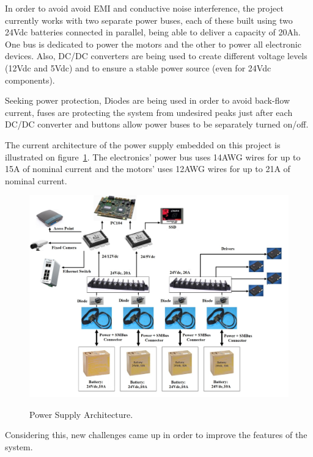 \documentclass{ifacconf}
\begin{document}
In order to avoid avoid EMI and conductive noise interference, the project
currently works with two separate power buses, each of these built using two
24Vdc batteries connected in parallel, being able to deliver a capacity of
20Ah. One bus is dedicated to power the motors and the other to power all
electronic devices. Also, DC/DC converters are
being used to create different voltage levels (12Vdc and 5Vdc) and to
ensure a stable power source (even for 24Vdc components). 

Seeking power protection, Diodes are being used in order to avoid back-flow
current, fuses are protecting the system from undesired peaks just after each
DC/DC converter and buttons allow power buses to be separately turned on/off.


The current architecture of the power supply embedded on this project is
illustrated on figure~\ref{fig:DiagramaSAM}. The electronics' power bus uses
14AWG wires for up to 15A of nominal current and the motors' uses
12AWG wires for up to 21A of nominal current.

\begin{figure}[ht]
\centering
    \includegraphics[angle=90,width=1\columnwidth]{figs/DiagramaSAM.jpg}  %
    \label{fig:DiagramaSAM}
\caption{Power Supply Architecture.}\vspace{-0.25cm}
\end{figure}

Considering this, new challenges came up in order to improve the features of
the system.
\end{document}
